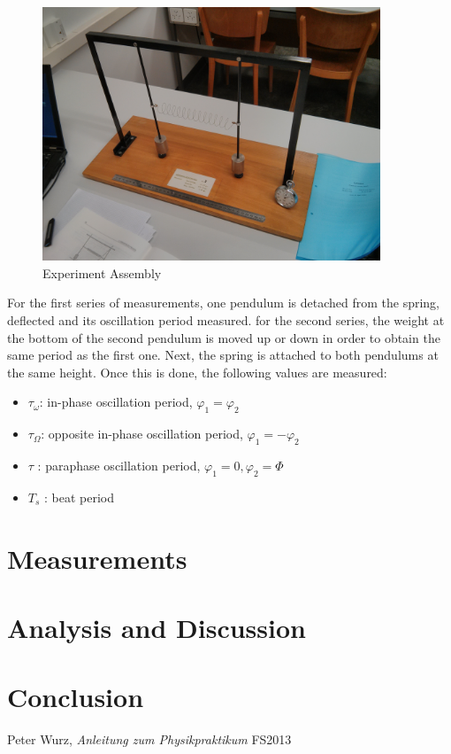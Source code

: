 \documentclass{scrreprt}
\renewcommand{\phi}{\varphi}
\begin{document}
\begin{figure}[H]
	\centering
  \includegraphics[width=0.9\textwidth]{img/assembly.jpg}
	\caption{Experiment Assembly}
	\label{fig:assembly}
\end{figure}
For the first series of measurements, one pendulum is detached from the spring, deflected and its oscillation period measured. for the second series, the weight at the bottom of the second pendulum is moved up or down in order to obtain the same period as the first one. Next, the spring is attached to both pendulums at the same height. Once this is done, the following values are measured:
\begin{itemize}
\item $\tau_{\omega}$: in-phase oscillation period, $\phi_1 = \phi_2$
\item $\tau_{\Omega}$: opposite in-phase oscillation period, $\phi_1 = -\phi_2$
\item $\tau$ : paraphase oscillation period, $\phi_1 = 0, \phi_2 = \Phi$
\item $T_s$ : beat period
\end{itemize}
\section{Measurements}

\section{Analysis and Discussion}

\section{Conclusion}

\begin{thebibliography}{9}

  Peter Wurz,
  \emph{Anleitung zum Physikpraktikum}
  FS2013

\end{thebibliography}
\end{document}
